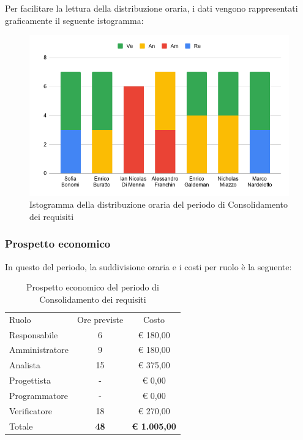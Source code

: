 \documentclass[../piano-di-progetto.tex]{subfiles}
\begin{document}
  Per facilitare la lettura della distribuzione oraria, i dati vengono rappresentati graficamente il seguente istogramma:
  \begin{figure}[H]
    \centering
    \includegraphics[width=12cm]{img/ore-consolidamento.png}
    \caption{Istogramma della distribuzione oraria del periodo di Consolidamento dei requisiti}
    \label{fig:ore-componente-consolidamento}
  \end{figure}

  \subsubsection{Prospetto economico}
  In questo del periodo, la suddivisione oraria e i costi per ruolo è la seguente:

  \begin{table}[H]
    \centering
    \begin{tabular}{lcc}
      Ruolo          & Ore previste & Costo      \\
      Responsabile   & 6            & € 180,00   \\
      Amministratore & 9            & € 180,00   \\
      Analista       & 15           & € 375,00   \\
      Progettista    & -            & € 0,00     \\
      Programmatore  & -            & € 0,00     \\
      Verificatore   & 18           & € 270,00   \\
      Totale         & \textbf{48}           & \textbf{€ 1.005,00}
    \end{tabular}
    \caption{Prospetto economico del periodo di Consolidamento dei requisiti}
  \end{table}
\end{document}
